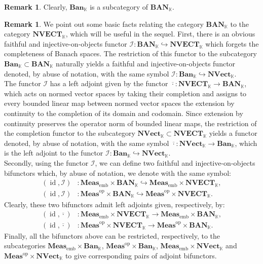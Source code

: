 \documentclass{amsart}
\theoremstyle{definition}
\newtheorem{remark}[definition]{Remark}
\theoremstyle{plain}
\newcommand{\id}{\operatorname{id}}
\newcommand{\opMeas}{\mathbf{Meas}^\mathrm{op}}
\newcommand{\embMeas}{\mathbf{Meas}_\mathrm{emb}}
\newcommand{\NVect}{\mathbf{NVect}_{\mathbb{K}}}
\newcommand{\NVECT}{\mathbf{NVECT}_{\mathbb{K}}}
\newcommand{\Ban}{\mathbf{Ban}_{\mathbb{K}}}
\newcommand{\BAN}{\mathbf{BAN}_{\mathbb{K}}}
\begin{document}
        \begin{remark}
            Clearly, $\Ban$ is a subcategory of $\BAN$.   
        \end{remark}

        \begin{remark}
        \label{rem:relating Ban and NVect}
            We point out some basic facts relating the category $\BAN$ to the category $\NVECT$, which will be useful in the sequel.
            First, there is an obvious faithful and injective-on-objects functor $\mathcal{I} \colon \BAN \hookrightarrow \NVECT$ which forgets the completeness of Banach spaces.
            The restriction of this functor to the subcategory $\Ban \subset \BAN$ naturally yields a faithful and injective-on-objects functor denoted, by abuse of notation, with the same symbol $\mathcal{I} \colon \Ban \hookrightarrow \NVect$. \\
            The functor $\mathcal{I}$ has a left adjoint given by the functor $\overline{\cdot} \colon \NVECT \rightarrow \BAN$, which acts on normed vector spaces by taking their completion and assigns to every bounded linear map between normed vector spaces the extension by continuity to the completion of its domain and codomain.
            Since extension by continuity preserves the operator norm of bounded linear maps, the restriction of the completion functor to the subcategory $\NVect \subset \NVECT$ yields a functor denoted, by abuse of notation, with the same symbol $\overline{\cdot} \colon \NVect \rightarrow \Ban$, which is the left adjoint to the functor $\mathcal{I} \colon \Ban \hookrightarrow \NVect$. \\
            Secondly, using the functor $\mathcal{I}$, we can define two faithful and injective-on-objects bifunctors which, by abuse of notation, we denote with the same symbol: 
            \begin{equation*}
                \begin{split}
                    (\id,\mathcal{I}) &\colon \embMeas \times \BAN \hookrightarrow \embMeas \times \NVECT, \\
                    (\id,\mathcal{I}) &\colon \opMeas \times \BAN \hookrightarrow \opMeas \times \NVECT.
                \end{split}
            \end{equation*}
            Clearly, these two bifunctors admit left adjoints given, respectively, by:
            \begin{equation*}
                \begin{split}
                    (\id,\overline{\cdot}) &\colon \embMeas \times \NVECT \rightarrow \embMeas \times \BAN, \\
                    (\id,\overline{\cdot}) &\colon \opMeas \times \NVECT \rightarrow \opMeas \times \BAN.
                \end{split}
            \end{equation*}
            Finally, all the bifunctors above can be restricted, respectively, to the subcategories $\embMeas \times \Ban$, $\opMeas \times \Ban$, $\embMeas \times \NVect$ and $\opMeas \times \NVect$ to give corresponding pairs of adjoint bifunctors.
        \end{remark}
        
\end{document}
